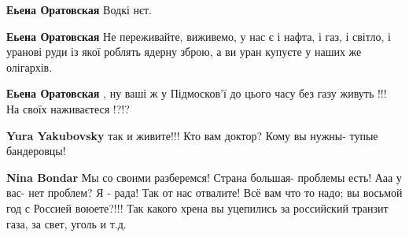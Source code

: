 \begin{itemize}
\begin{itemize}
\begin{itemize}
 
\textbf{Еьена Оратовская} Водкі нєт.

 
\textbf{Еьена Оратовская} Не переживайте, виживемо, у нас є і нафта, і газ, і світло, і уранові руди із якої роблять ядерну зброю, а ви уран купуєте у наших же олігархів.

 
\textbf{Еьена Оратовская} , ну ваші ж у Підмосков'ї до цього часу без газу живуть !!! На своїх наживаєтеся !?!?

 
\textbf{Yura Yakubovsky} так и живите!!! Кто вам доктор? Кому вы нужны- тупые бандеровцы!

 
\textbf{Nina Bondar} Мы со своими разберемся! Страна большая- проблемы есть! Ааа у вас- нет проблем? Я - рада! Так от нас отвалите! Всё вам что то надо; вы восьмой год с Россией воюете?!!! Так какого хрена вы уцепились за российский транзит газа, за свет, уголь и т.д.

 

\end{itemize}
\end{itemize}
\end{itemize}
